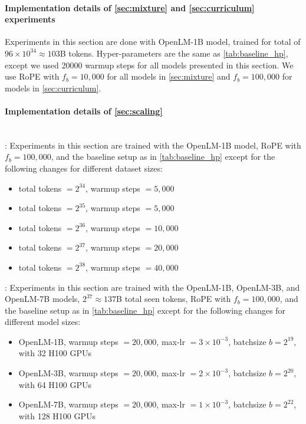 \paragraph{Implementation details of \cref{sec:mixture} and \cref{sec:curriculum} experiments}
Experiments in this section are done with OpenLM-1B model, trained for total of $96\times10^{34}\approx 103$B tokens. Hyper-parameters are the same as \cref{tab:baseline_hp}, except we used 20000 warmup steps for all models presented in this section. We use RoPE with $f_b = 10,000$ for all models in \cref{sec:mixture} and $f_b = 100,000$ for models in \cref{sec:curriculum}.

\paragraph{Implementation details of \cref{sec:scaling}}
\quad\\
: Experiments in this section are trained with the OpenLM-1B model, RoPE with $f_b = 100,000$, and the baseline setup as in \cref{tab:baseline_hp} except for the following changes for different dataset sizes:

\begin{itemize}
    \item total tokens $=2^{34}$, warmup steps $=5,000$
    \item total tokens $=2^{35}$, warmup steps $=5,000$ 
    \item total tokens $=2^{36}$, warmup steps $=10,000$ 
    \item total tokens $=2^{37}$, warmup steps $=20,000$ 
    \item total tokens $=2^{38}$, warmup steps $=40,000$ 
\end{itemize}

: Experiments in this section are trained with the OpenLM-1B, OpenLM-3B, and OpenLM-7B models, $2^{37}\approx 137$B total seen tokens, RoPE with $f_b = 100,000$, and the baseline setup as in \cref{tab:baseline_hp} except for the following changes for different model sizes:

\begin{itemize}
    \item OpenLM-1B, warmup steps $=20,000$, max-lr $=3 \times 10^{-3}$, batchsize  $b=2^{19}$, with 32 H100 GPUs
    \item OpenLM-3B, warmup steps $=20,000$, max-lr $=2 \times 10^{-3}$, batchsize  $b=2^{20}$, with 64 H100 GPUs
    \item OpenLM-7B, warmup steps $=20,000$, max-lr $=1 \times 10^{-3}$, batchsize  $b=2^{22}$, with 128 H100 GPUs 
\end{itemize}



